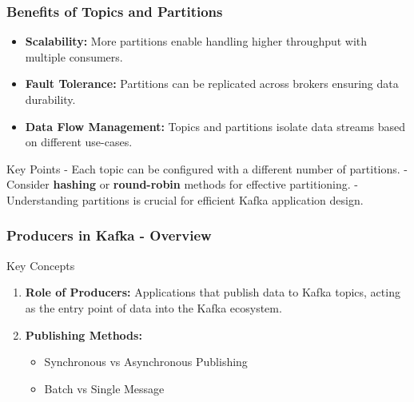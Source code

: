 \documentclass[aspectratio=169]{beamer}
\begin{document}
\begin{frame}[fragile]
    \frametitle{Benefits of Topics and Partitions}
    \begin{itemize}
        \item \textbf{Scalability:} More partitions enable handling higher throughput with multiple consumers.
        \item \textbf{Fault Tolerance:} Partitions can be replicated across brokers ensuring data durability.
        \item \textbf{Data Flow Management:} Topics and partitions isolate data streams based on different use-cases.
    \end{itemize}
    
    \begin{block}{Key Points}
        - Each topic can be configured with a different number of partitions.
        - Consider \textbf{hashing} or \textbf{round-robin} methods for effective partitioning.
        - Understanding partitions is crucial for efficient Kafka application design.
    \end{block}
\end{frame}

\begin{frame}[fragile]
    \frametitle{Producers in Kafka - Overview}
    \begin{block}{Key Concepts}
        \begin{enumerate}
            \item \textbf{Role of Producers:} Applications that publish data to Kafka topics, acting as the entry point of data into the Kafka ecosystem.
            \item \textbf{Publishing Methods:} 
                \begin{itemize}
                    \item Synchronous vs Asynchronous Publishing
                    \item Batch vs Single Message
                \end{itemize}
        \end{enumerate}
    \end{block}
\end{frame}
\end{document}
